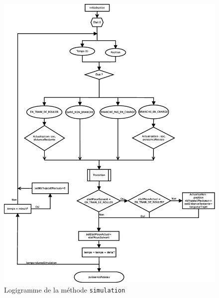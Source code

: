 \documentclass[10pt]{article}
\begin{document}
			\begin{figure}[h]
				\centering
				\caption{Logigramme de la méthode \texttt{simulation} \label{fig.flowPrincipal}}
				\includegraphics[height=0.9\textheight]{fig/flowPrincipal.eps}
			\end{figure}
\end{document}
